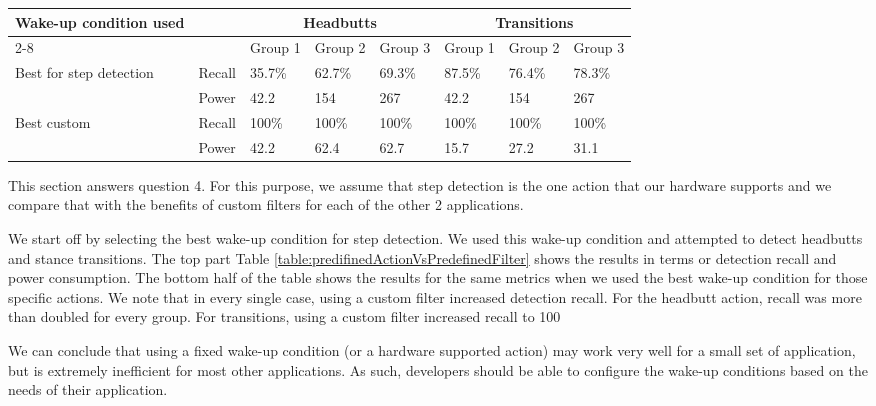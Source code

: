 \begin{table*}[t]
    \begin{tabular}{|l|l|l|l|l|l|l|l|}
    \hline
    \multirow{2}{*}{ Wake-up condition used}
							& \multirow{2}{*}{~}	& \multicolumn{3}{c|}{Headbutts} 	& \multicolumn{3}{c|}{Transitions} 	\\ \cline{2-8}
							&						& Group 1 	& Group 2	& Group 3 	& Group 1 	& Group 2	& Group 3 	\\ \hline
    \multirow{2}{*}{Best for step detection}
							& Recall 				& 35.7\%  	& 62.7\%    & 69.3\%  	& 87.5\% 	& 76.4\%	& 78.3\%  	\\ \cline{2-8}
							& Power  				& 42.2 		& 154       & 267     	& 42.2 		& 154		& 267     	\\ \hline
    \multirow{2}{*}{Best custom}
							& Recall 				& 100\%   	& 100\%     & 100\%   	& 100\%   	& 100\%		& 100\%   	\\ \cline{2-8}
							& Power  				& 42.2   	& 62.4      & 62.7    	& 15.7    	& 27.2		& 31.1    	\\ \hline
    \end{tabular}
	\caption{Detection recall and power consumption for the Headbutts and Transitions actions using fixed or custom wake-up conditions}
	\label{table:predifinedActionVsPredefinedFilter}
\end{table*}

This section answers question 4. For this purpose, we assume that step detection is the one action that our hardware supports and we compare that with the benefits of custom filters for each of the other 2 applications. 

We start off by selecting the best wake-up condition for step detection. We used this wake-up condition and attempted to detect headbutts and stance transitions. The top part Table \ref{table:predifinedActionVsPredefinedFilter} shows the results in terms or detection recall and power consumption. The bottom half of the table shows the results for the same metrics when we used the best wake-up condition for those specific actions. We note that in every single case, using a custom filter increased detection recall. For the headbutt action, recall was more than doubled for every group. For transitions, using a custom filter increased recall to 100%

We can conclude that using a fixed wake-up condition (or a hardware supported action) may work very well for a small set of application, but is extremely inefficient for most other applications. As such, developers should be able to configure the wake-up conditions based on the needs of their application. 

